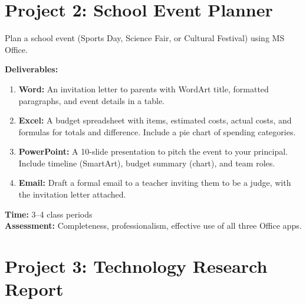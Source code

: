\section{Project 2: School Event Planner}
\label{sec:proj2}

\begin{labstep}
Plan a school event (Sports Day, Science Fair, or Cultural Festival) using MS Office.

\textbf{Deliverables:}
\begin{enumerate}[label=\textcolor{ModuleBlue}{\textbf{\arabic*.}}, itemsep=3pt]
  \item \textbf{Word:} An invitation letter to parents with WordArt title, formatted paragraphs, and event details in a table.
  \item \textbf{Excel:} A budget spreadsheet with items, estimated costs, actual costs, and formulas for totals and difference. Include a pie chart of spending categories.
  \item \textbf{PowerPoint:} A 10-slide presentation to pitch the event to your principal. Include timeline (SmartArt), budget summary (chart), and team roles.
  \item \textbf{Email:} Draft a formal email to a teacher inviting them to be a judge, with the invitation letter attached.
\end{enumerate}

\textbf{Time:} 3--4 class periods\\
\textbf{Assessment:} Completeness, professionalism, effective use of all three Office apps.
\end{labstep}

\section{Project 3: Technology Research Report}
\label{sec:proj3}

